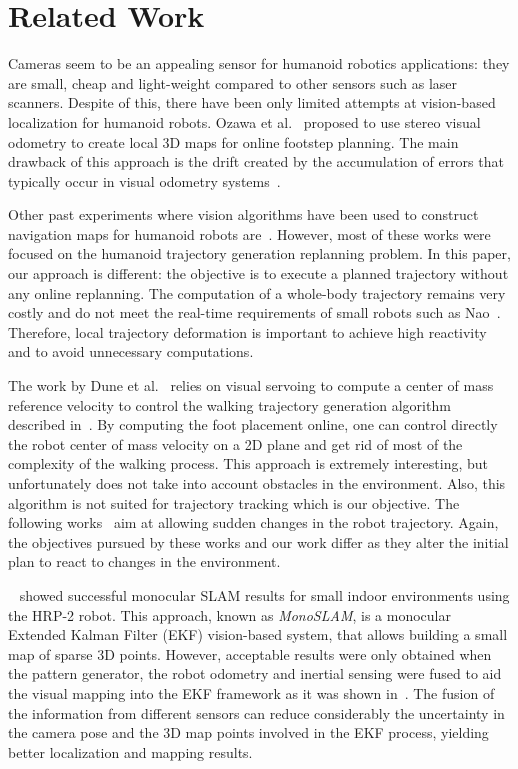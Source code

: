 \section{Related Work}\label{sec:related}
Cameras seem to be an appealing sensor for humanoid robotics applications: they are small, cheap and light-weight compared to other sensors such as laser scanners. Despite of this, there have been only limited
attempts at vision-based localization for humanoid robots. Ozawa et al.~\cite{Ozawa05smc} proposed to use stereo visual odometry to create local 3D maps for online footstep planning. The main drawback of this
approach is the drift created by the accumulation of errors that typically occur in visual odometry systems~\cite{Kaess09icra}. 

Other past experiments where vision algorithms have been used to construct navigation maps for humanoid robots are~\cite{Michel05humanoids,Michel06icra,Chestnut10book}. However, most of these works were focused on the humanoid trajectory generation replanning problem. In this paper, our approach is different: the
objective is to execute a planned trajectory without any online replanning. The computation of a whole-body trajectory remains very costly and do not meet the real-time requirements of small robots such
as Nao~\cite{wikipedia.nao}. Therefore, local trajectory deformation is important to achieve high reactivity and to avoid unnecessary computations.

The work by Dune et al.~\cite{Dune10iros} relies on visual servoing to compute a center of mass reference velocity to control the walking trajectory generation algorithm described in~\cite{Herdt10adr}. By
computing the foot placement online, one can control directly the robot center of mass velocity on a 2D plane and get rid of most of the complexity of the walking process. This approach is extremely interesting, but unfortunately does not take into account obstacles in the environment. Also, this algorithm is not suited for trajectory tracking which is our objective. The following works~\cite{Harada04humanoids,Morisawa07icra} aim at allowing sudden changes in the robot trajectory. Again, the objectives pursued by these works and our work differ as they alter the initial plan to react to changes in the environment.

~\citet{Davison07pami} showed successful monocular SLAM results for small indoor environments using the HRP-2 robot. This approach, known as \textit{MonoSLAM}, is a monocular Extended Kalman Filter (EKF)
vision-based system, that allows building a small map of sparse 3D points. However, acceptable results were only obtained when the pattern generator, the robot odometry and inertial sensing were fused to aid
the visual mapping into the EKF framework as it was shown in~\cite{Stasse06iros}. The fusion of the information from different sensors can reduce considerably the uncertainty in the camera pose and
the 3D map points involved in the EKF process, yielding better localization and mapping results.

